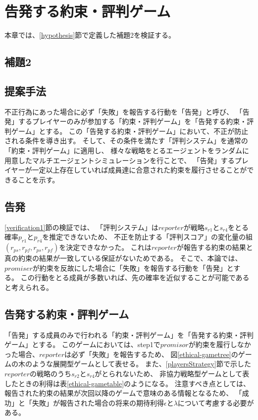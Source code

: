 \chapter{告発する約束・評判ゲーム}
本章では、\ref{hypothesis}節で定義した補題2を検証する。

\section{補題2}
\secondLemma

\section{提案手法}
不正行為にあった場合に必ず「失敗」を報告する行動を「告発」と呼び、
「告発」するプレイヤーのみが参加する「約束・評判ゲーム」を「告発する約束・評判ゲーム」とする。
この「告発する約束・評判ゲーム」において、不正が防止される条件を導き出す。
そして、その条件を満たす「評判システム」を通常の「約束・評判ゲーム」に適用し、
様々な戦略をとるエージェントをランダムに用意したマルチエージェントシミュレーションを行ことで、
「告発」するプレイヤーが一定以上存在していれば成員達に合意された約束を履行させることができることを示す。


\section{告発}
\ref{verification1}節の検証では、
「評判システム」は$reporter$が戦略$s_{r1}$と$s_{r4}$をとる確率$p_{r1}$と$p_{r4}$を推定できないため、
不正を防止する「評判スコア」の変化量の組$(r_{ps}, r_{pf}, r_{ps}, r_{pf})$を決定できなかった。
これは$reporter$が報告する約束の結果と真の約束の結果が一致している保証がないためである。
そこで、本論では、$promiser$が約束を反故にした場合に「失敗」を報告する行動を「告発」とする。
この行動をとる成員が多数いれば、先の確率を近似することが可能であると考えられる。


\section{告発する約束・評判ゲーム}
「告発」する成員のみで行われる「約束・評判ゲーム」を「告発する約束・評判ゲーム」とする。
このゲームにおいては、step1で$promisor$が約束を履行しなかった場合、$reporter$は必ず「失敗」を報告するため、
図\ref{ethical-gametree}のゲームの木のような展開型ゲームとして表せる。
また、\ref{playersStrategy}節で示した$reporter$の戦略のうち$s_{r2}$と$s_{r4}$がとられないため、
非協力戦略型ゲームとして表したときの利得は表\ref{ethical-gametable}のようになる。
注意すべき点としては、報告された約束の結果が次回以降のゲームで意味のある情報となるため、
「成功」と「失敗」が報告された場合の将来の期待利得$\epsilon$と$\lambda$について考慮する必要がある。

